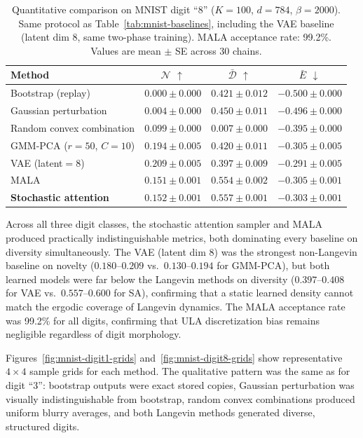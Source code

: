 \begin{table}[h]
\centering
\caption{Quantitative comparison on MNIST digit ``8'' ($K{=}100$, $d{=}784$, $\beta{=}2000$). Same protocol as Table~\ref{tab:mnist-baselines}, including the VAE baseline (latent dim 8, same two-phase training). MALA acceptance rate: 99.2\%. Values are mean $\pm$ SE across 30 chains.}
\label{tab:mnist-digit8}
\small
\begin{tabular}{@{}lccc@{}}
\toprule
Method & $\mathcal{N}$ $\uparrow$ & $\bar{\mathcal{D}}$ $\uparrow$ & $\bar{E}$ $\downarrow$ \\
\midrule
Bootstrap (replay)          & $0.000 \pm 0.000$ & $0.421 \pm 0.012$ & $-0.500 \pm 0.000$ \\
Gaussian perturbation       & $0.004 \pm 0.000$ & $0.450 \pm 0.011$ & $-0.496 \pm 0.000$ \\
Random convex combination   & $0.099 \pm 0.000$ & $0.007 \pm 0.000$ & $-0.395 \pm 0.000$ \\
GMM-PCA ($r{=}50$, $C{=}10$) & $0.194 \pm 0.005$ & $0.420 \pm 0.011$ & $-0.305 \pm 0.005$ \\
VAE (latent${=}8$)          & $0.209 \pm 0.005$ & $0.397 \pm 0.009$ & $-0.291 \pm 0.005$ \\
MALA                        & $0.151 \pm 0.001$ & $0.554 \pm 0.002$ & $-0.305 \pm 0.001$ \\
\textbf{Stochastic attention} & $\mathbf{0.152 \pm 0.001}$ & $\mathbf{0.557 \pm 0.001}$ & $\mathbf{-0.303 \pm 0.001}$ \\
\bottomrule
\end{tabular}
\end{table}

Across all three digit classes, the stochastic attention sampler and MALA produced practically indistinguishable metrics, both dominating every baseline on diversity simultaneously. The VAE (latent dim 8) was the strongest non-Langevin baseline on novelty ($0.180$--$0.209$ vs.\ $0.130$--$0.194$ for GMM-PCA), but both learned models were far below the Langevin methods on diversity ($0.397$--$0.408$ for VAE vs.\ $0.557$--$0.600$ for SA), confirming that a static learned density cannot match the ergodic coverage of Langevin dynamics. The MALA acceptance rate was 99.2\% for all digits, confirming that ULA discretization bias remains negligible regardless of digit morphology.

Figures~\ref{fig:mnist-digit1-grids} and~\ref{fig:mnist-digit8-grids} show representative $4{\times}4$ sample grids for each method. The qualitative pattern was the same as for digit ``3'': bootstrap outputs were exact stored copies, Gaussian perturbation was visually indistinguishable from bootstrap, random convex combinations produced uniform blurry averages, and both Langevin methods generated diverse, structured digits.

